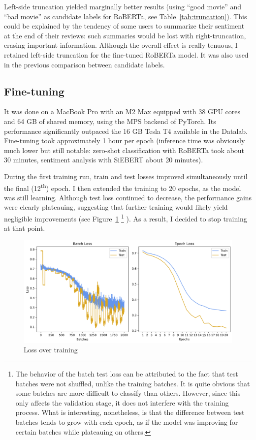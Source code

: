 \documentclass{article}
\begin{document}
Left-side truncation yielded marginally better results (using \enquote{good movie} and \enquote{bad movie} as candidate labels for RoBERTa, see Table~\ref{tab:truncation}). This could be explained by the tendency of some users to summarize their sentiment at the end of their reviews: such summaries would be lost with right-truncation, erasing important information. Although the overall effect is really tenuous, I retained left-side truncation for the fine-tuned RoBERTa model. It was also used in the previous comparison between candidate labels.

\subsection{Fine-tuning}

It was done on a MacBook Pro with an M2 Max equipped with 38 GPU cores and 64 GB of shared memory, using the MPS backend of PyTorch. Its performance significantly outpaced the 16 GB Tesla T4 available in the Datalab. Fine-tuning took approximately 1 hour per epoch (inference time was obviously much lower but still notable: zero-shot classification with RoBERTa took about 30 minutes, sentiment analysis with SiEBERT about 20 minutes). 

During the first training run, train and test losses improved simultaneously until the final (12\textsuperscript{th}) epoch. I then extended the training to 20 epochs, as the model was still learning. Although test loss continued to decrease, the performance gains were clearly plateauing, suggesting that further training would likely yield negligible improvements (see Figure~\ref{fig:roberta-learning-1} 
\footnote{The behavior of the batch test loss can be attributed to the fact that test batches were not shuffled, unlike the training batches. It is quite obvious that some batches are more difficult to classify than others. However, since this only affects the validation stage, it does not interfere with the training process. What is interesting, nonetheless, is that the difference between test batches tends to grow with each epoch, as if the model was improving for certain batches while plateauing on others.}
). As a result, I decided to stop training at that point.

\begin{figure}
  \centering
  \includegraphics[width=\textwidth]{figures/RoBERTa_learning_curves_1.png}
  \caption{Loss over training}
  \label{fig:roberta-learning-1}
\end{figure}
\end{document}
